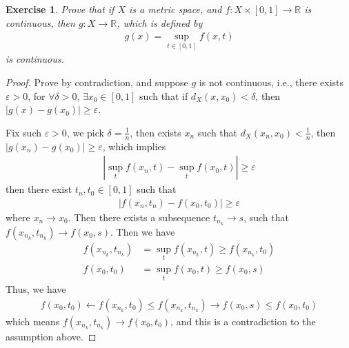 \documentclass[12pt,leqno]{amsart}
\newtheorem{exercise}{Exercise}[section]
\theoremstyle{definition}
\numberwithin{equation}{subsection}
\begin{document}
\begin{exercise}
Prove that if $X$ is a metric space, and $f:X\times[0,1]\to\mathbb{R}$ is continuous, then $g:X\to\mathbb{R}$, which is defined by 
\begin{align*}
    g(x) = \sup_{t\in[0,1]}f(x,t)
\end{align*}
is continuous.
\end{exercise}
\begin{proof}
Prove by contradiction, and suppose $g$ is not continuous, i.e., there exists $\varepsilon > 0$, for $\forall \delta > 0$, $\exists x_0 \in[0,1]$ such that if $d_X(x,x_0) < \delta$, then $|g(x) - g(x_0)|\geq\varepsilon$. 

Fix such $\varepsilon > 0$, we pick $\delta = \frac{1}{n}$, then exists $x_n$ such that $d_X(x_n,x_0) < \frac{1}{n}$, then $|g(x_n) - g(x_0)| \geq \varepsilon$, which implies
\begin{align*}
    \left|\sup_t f(x_n,t) - \sup_t f(x_0,t)\right| \geq \varepsilon
\end{align*}
then there exist $t_n, t_0\in[0,1]$ such that 
\begin{align*}
    \left|f(x_n,t_n) - f(x_0,t_0)\right| \geq \varepsilon
\end{align*}
where $x_n\to x_0$. Then there exists a subsequence $t_{n_k}\to s$, such that $f(x_{n_k},t_{n_k})\to f(x_0,s)$. Then we have 
\begin{align*}
    f(x_{n_k},t_{n_k}) & = \sup_t f(x_{n_k},t) \geq f(x_{n_k},t_0) \\
    f(x_0,t_0) & = \sup_t f(x_0,t) \geq f(x_0,s) 
\end{align*}
Thus, we have 
\begin{align*}
    f(x_0,t_0) \leftarrow f(x_{n_k},t_0) \leq f(x_{n_k},t_{n_k}) \rightarrow f(x_0,s) \leq f(x_0,t_0)
\end{align*}
which means $f(x_{n_k},t_{n_k})\to f(x_0,t_0)$, and this is a contradiction to the assumption above.
\end{proof}

\medskip
\end{document}
